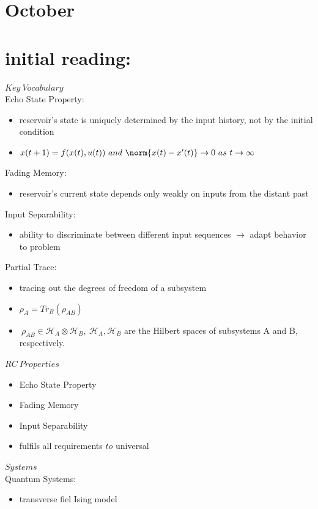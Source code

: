 \section*{October}

\section*{initial reading:}
$Key \ Vocabulary$ \\
Echo State Property:
\begin{itemize}
    \item reservoir's state is uniquely determined by the input history, not by the initial condition
    \item $x(t+1) = f(x(t), u(t)) \ and \ \norm{x(t)-x'(t)} \rightarrow 0 \ as \ t \rightarrow \infty$
\end{itemize}

Fading Memory:
\begin{itemize}
    \item reservoir's current state depends only weakly on inputs from the distant past
\end{itemize}

Input Separability:
\begin{itemize}
    \item ability to discriminate between different input sequences $\to$ adapt behavior to problem
\end{itemize}

Partial Trace:
\begin{itemize}
    \item tracing out the degrees of freedom of a subsystem
    \item $\rho_A = Tr_B(\rho_{AB})$ 
    \item $\ \rho_{AB}\in \mathcal{H}_A \otimes \mathcal{H}_B, \ \mathcal{H}_A, \mathcal{H}_B$ are the Hilbert spaces of subsystems A and B, respectively.
\end{itemize}

$RC \ Properties$
\begin{itemize}
    \item Echo State Property
    \item Fading Memory
    \item Input Separability
    \item fulfils all requirements $to$ universal
\end{itemize}

$Systems$ \\
Quantum Systems:
\begin{itemize}
    \item transverse fiel Ising model
\end{itemize}



